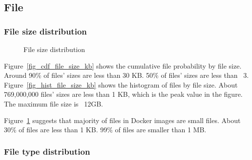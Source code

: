 \subsection{File}

\subsubsection{File size distribution}

\begin{figure}[!t]
	\centering
	\caption{File size distribution}
	\label{fig-file-size}
\end{figure}

Figure~\ref{fig_cdf_file_size_kb} shows the cumulative file probability by file size. Around 90\% of files' sizes are less than 30 KB. 50\% of files' sizes are less than ~3. Figure~\ref{fig_hist_file_size_kb} shows the histogram of files by file size. About 769,000,000 files' sizes are less than 1 KB, which is the peak value in the figure. The maximum file size is ~12GB.

Figure~\ref{fig-file-size} suggests that majority of files in Docker images are small files. About 30\% of files are less than 1 KB. 99\% of files are smaller than 1 MB.

\subsubsection{File type distribution}

